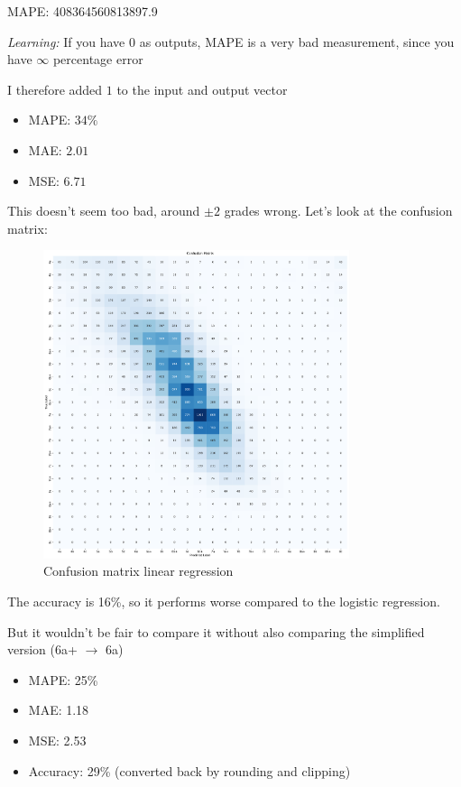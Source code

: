 \documentclass{article}
\begin{document}
MAPE: 408364560813897.9

\emph{Learning:} If you have 0 as outputs, MAPE is a very bad measurement, since you have $\infty$ percentage error

I therefore added $1$ to the input and output vector
\begin{itemize}
    \item MAPE: $34\%$
    \item MAE: $2.01$
    \item MSE: $6.71$
\end{itemize}

This doesn't seem too bad, around $\pm2$ grades wrong.
Let's look at the confusion matrix:

\begin{figure}[H]
    \centering    
    \includegraphics[width=0.8\textwidth]{../Models/LinearRegression/confusion_matrix.pdf}
    \caption{Confusion matrix linear regression}\label{fig:conf_linreg}
\end{figure}

The accuracy is 16\%, so it performs worse compared to the logistic regression.

But it wouldn't be fair to compare it without also comparing the simplified version (6a+ $\rightarrow$ 6a)

\begin{itemize}
    \item MAPE: 25\%
    \item MAE: 1.18
    \item MSE: 2.53
    \item Accuracy: 29\% \small{(converted back by rounding and clipping)}
\end{itemize}
\end{document}
